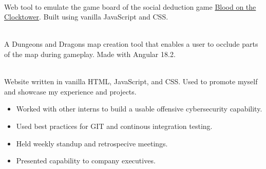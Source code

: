 \documentclass[10pt,a4paper,ragged2e,withhyper]{altacv}
\begin{document}

 \\\smallskip
Web tool to emulate the game board of the social deduction game \href{https://bloodontheclocktower.com/}{Blood on the Clocktower}. Built using vanilla JavaScript and CSS.

\divider

 \\\smallskip
A Dungeons and Dragons map creation tool that enables a user to occlude parts of the map during gameplay. Made with Angular 18.2.

\divider

 \\\smallskip
Website written in vanilla HTML, JavaScript, and CSS.
Used to promote myself and showcase my experience
and projects.




\smallskip
{}
\begin{paracol}{4}
\switchcolumn[1]
\switchcolumn[2]
\switchcolumn[3]
\end{paracol}


\smallskip
{}


\begin{itemize}
\item Worked with other interns to build a usable offensive cybersecurity capability.
\item Used best practices for GIT and continous integration testing.
\item Held weekly standup and retrospecive meetings.
\item Presented capability to company executives.
\end{itemize}
\end{document}
